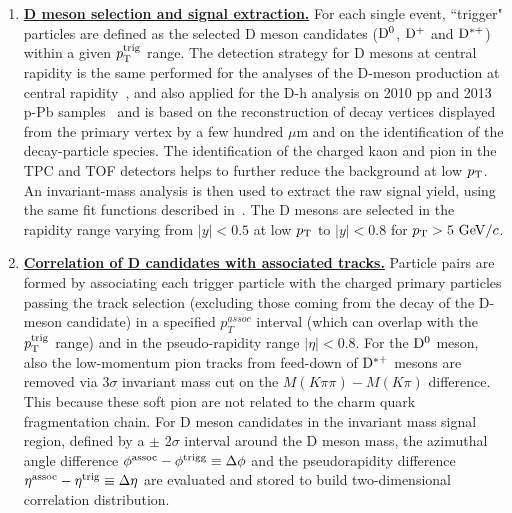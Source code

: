 \begin{enumerate}

\item
\underline {\bf D meson selection and signal extraction.}  For each single event, ``trigger" particles
are defined as the selected  D meson candidates (${\rm D^0}$, ${\rm D^+}$ and ${\rm D^{*+}}$)
within a given $p_{\rm T}^{\rm trig}$ range. The detection strategy for D mesons at central rapidity is
the same performed for the analyses of the D-meson production at central rapidity~\cite{ALICEDmespp7Tev}, and also applied for the D-h analysis on 2010 pp and 2013 p-Pb samples~\cite{ALICEDhcorr} and is based on the reconstruction of decay
vertices displayed from the primary vertex by a few hundred $\mu$m and on the identification of the decay-particle species.
The identification of the charged kaon and pion in the TPC and TOF
detectors helps to further reduce the background at low $p_{\rm T}$.  An
invariant-mass analysis is then used to extract the raw signal yield, using
the same fit functions described in~\cite{ALICEDhcorr}.
The D mesons are selected in the rapidity range varying from $|y|<0.5$ at low $p_{\rm T}$ to $|y|<0.8$ for $p_{\rm T}>5~\mathrm{GeV}/c$. %

\item
\underline{\bf Correlation of D candidates with associated tracks.}
Particle pairs are formed by associating each trigger particle with
the charged primary particles passing the track selection (excluding those coming from the decay of the D-meson candidate) in a specified $p^{assoc}_{T}$
interval (which can overlap with the $p_{\rm T}^{\rm trig}$ range) and in the pseudo-rapidity range $|\eta|<0.8$. For the ${\rm D^0}$ meson, also the low-momentum pion tracks from feed-down of ${\rm D^{*+}}$ mesons are removed via 3$\sigma$ invariant mass cut on the $M(K\pi\pi)-M(K\pi)$ difference. This because these soft pion are not related to the charm quark fragmentation chain.
For D meson candidates in the invariant mass signal region, defined by a $\pm$ 2$\sigma$ interval around the D meson mass, the azimuthal angle difference $\phi^{\rm assoc}-\phi^{\rm trigg}\equiv\Delta\phi$
and the pseudorapidity difference $\eta^{\rm assoc}-\eta^{\rm trig}\equiv\Delta \eta$ are evaluated and stored to build two-dimensional correlation distribution. %


\end{enumerate}
